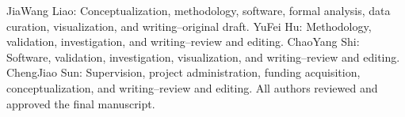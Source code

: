JiaWang Liao: Conceptualization, methodology, software, formal analysis, data curation, visualization, and writing--original draft. YuFei Hu: Methodology, validation, investigation, and writing--review and editing. ChaoYang Shi: Software, validation, investigation, visualization, and writing--review and editing. ChengJiao Sun: Supervision, project administration, funding acquisition, conceptualization, and writing--review and editing. All authors reviewed and approved the final manuscript.
